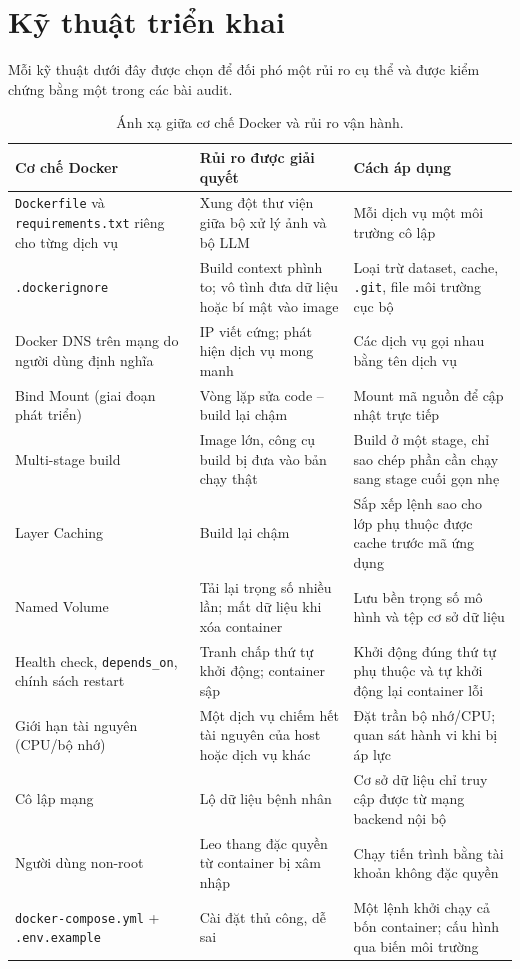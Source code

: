 \documentclass[11pt,a4paper]{article}
\begin{document}
\section{Kỹ thuật triển khai}
Mỗi kỹ thuật dưới đây được chọn để đối phó một rủi ro cụ thể và được kiểm chứng bằng một trong các bài audit.

\begin{table}[h]
\centering
\small
\begin{tabularx}{\textwidth}{@{}p{3.6cm} X X@{}}
\toprule
\textbf{Cơ chế Docker} & \textbf{Rủi ro được giải quyết} & \textbf{Cách áp dụng} \\
\midrule
\texttt{Dockerfile} và \texttt{requirements.txt} riêng cho từng dịch vụ & Xung đột thư viện giữa bộ xử lý ảnh và bộ LLM & Mỗi dịch vụ một môi trường cô lập \\
\texttt{.dockerignore} & Build context phình to; vô tình đưa dữ liệu hoặc bí mật vào image & Loại trừ dataset, cache, \texttt{.git}, file môi trường cục bộ \\
Docker DNS trên mạng do người dùng định nghĩa & IP viết cứng; phát hiện dịch vụ mong manh & Các dịch vụ gọi nhau bằng tên dịch vụ \\
Bind Mount (giai đoạn phát triển) & Vòng lặp sửa code -- build lại chậm & Mount mã nguồn để cập nhật trực tiếp \\
Multi-stage build & Image lớn, công cụ build bị đưa vào bản chạy thật & Build ở một stage, chỉ sao chép phần cần chạy sang stage cuối gọn nhẹ \\
Layer Caching & Build lại chậm & Sắp xếp lệnh sao cho lớp phụ thuộc được cache trước mã ứng dụng \\
Named Volume & Tải lại trọng số nhiều lần; mất dữ liệu khi xóa container & Lưu bền trọng số mô hình và tệp cơ sở dữ liệu \\
Health check, \texttt{depends\_on}, chính sách restart & Tranh chấp thứ tự khởi động; container sập & Khởi động đúng thứ tự phụ thuộc và tự khởi động lại container lỗi \\
Giới hạn tài nguyên (CPU/bộ nhớ) & Một dịch vụ chiếm hết tài nguyên của host hoặc dịch vụ khác & Đặt trần bộ nhớ/CPU; quan sát hành vi khi bị áp lực \\
Cô lập mạng & Lộ dữ liệu bệnh nhân & Cơ sở dữ liệu chỉ truy cập được từ mạng backend nội bộ \\
Người dùng non-root & Leo thang đặc quyền từ container bị xâm nhập & Chạy tiến trình bằng tài khoản không đặc quyền \\
\texttt{docker-compose.yml} + \texttt{.env.example} & Cài đặt thủ công, dễ sai & Một lệnh khởi chạy cả bốn container; cấu hình qua biến môi trường \\
\bottomrule
\end{tabularx}
\caption{Ánh xạ giữa cơ chế Docker và rủi ro vận hành.}
\end{table}
\end{document}
